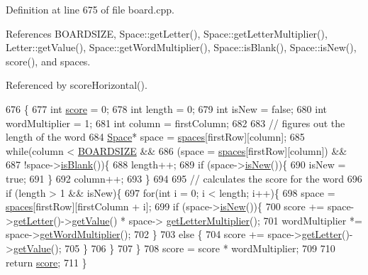 Definition at line 675 of file board.\-cpp.



References B\-O\-A\-R\-D\-S\-I\-Z\-E, Space\-::get\-Letter(), Space\-::get\-Letter\-Multiplier(), Letter\-::get\-Value(), Space\-::get\-Word\-Multiplier(), Space\-::is\-Blank(), Space\-::is\-New(), score(), and spaces.



Referenced by score\-Horizontal().


\begin{DoxyCode}
676 \{
677     \textcolor{keywordtype}{int} \hyperlink{class_board_a48c3a272cb4a47509ddd88edaec2bb59}{score} = 0;
678     \textcolor{keywordtype}{int} length = 0;
679     \textcolor{keywordtype}{int} isNew = \textcolor{keyword}{false};
680     \textcolor{keywordtype}{int} wordMultiplier = 1;
681     \textcolor{keywordtype}{int} column = firstColumn;
682 
683     \textcolor{comment}{// figures out the length of the word}
684     \hyperlink{class_space}{Space}* space = \hyperlink{class_board_a73b12248ddb6ee3adc24f4458d8661c2}{spaces}[firstRow][column];
685     \textcolor{keywordflow}{while}(column < \hyperlink{board_8h_afb909c1a2193edc88c68390c025b2fa7}{BOARDSIZE} &&
686           (space = \hyperlink{class_board_a73b12248ddb6ee3adc24f4458d8661c2}{spaces}[firstRow][column]) &&
687           !space->\hyperlink{class_space_a308f0ef400183df78df69717ca50cfee}{isBlank}())\{
688         length++;
689         \textcolor{keywordflow}{if} (space->\hyperlink{class_space_aa24aa1c8ac8b6033fc041d79345bac71}{isNew}())\{
690             isNew = \textcolor{keyword}{true};
691         \}
692         column++;
693     \}
694 
695     \textcolor{comment}{// calculates the score for the word}
696     \textcolor{keywordflow}{if} (length > 1 && isNew)\{
697         \textcolor{keywordflow}{for}(\textcolor{keywordtype}{int} i = 0; i < length; i++)\{
698             space = \hyperlink{class_board_a73b12248ddb6ee3adc24f4458d8661c2}{spaces}[firstRow][firstColumn + i];
699             \textcolor{keywordflow}{if} (space->\hyperlink{class_space_aa24aa1c8ac8b6033fc041d79345bac71}{isNew}())\{
700                 score += space->\hyperlink{class_space_a207bc025538775ce43bdcc0d8c4c3599}{getLetter}()->\hyperlink{class_letter_a5980d43229d58bfab9fdb20f25e88e9e}{getValue}() * space->
      \hyperlink{class_space_af35759deb33db2b7b7c77a40716c179f}{getLetterMultiplier}();
701                 wordMultiplier *= space->\hyperlink{class_space_a6a26a281a90288d56c83cc76b53cb6fb}{getWordMultiplier}();
702             \}
703             \textcolor{keywordflow}{else} \{
704                 score += space->\hyperlink{class_space_a207bc025538775ce43bdcc0d8c4c3599}{getLetter}()->\hyperlink{class_letter_a5980d43229d58bfab9fdb20f25e88e9e}{getValue}();
705             \}
706         \}
707     \}
708     score = score * wordMultiplier;
709 
710     \textcolor{keywordflow}{return} \hyperlink{class_board_a48c3a272cb4a47509ddd88edaec2bb59}{score};
711 \}
\end{DoxyCode}
